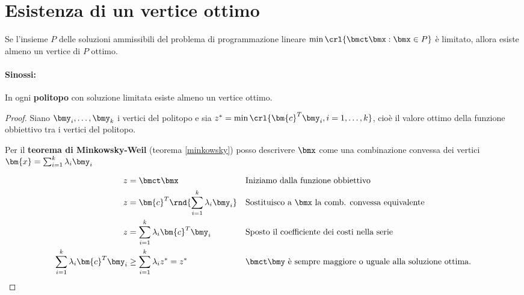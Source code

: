 \documentclass[\main/main.tex]{subfiles}
\begin{document}
\section{Esistenza di un vertice ottimo}

\begin{theorem}
  Se l'insieme $P$ delle soluzioni ammissibili del problema di programmazione lineare $\min\crl{\bmct\bmx:\bmx\in P}$ è limitato, allora esiste almeno un vertice di $P$ ottimo.
  \paragraph*{Sinossi:} In ogni \textbf{politopo} con soluzione limitata esiste almeno un vertice ottimo.
\end{theorem}

\begin{proof}
  Siano $\bmy_i, \ldots, \bmy_k$ i vertici del politopo e sia $z^* = \min \crl{\bm{c}^T\bmy_i, i=1,\ldots,k}$, cioè il valore ottimo della funzione obbiettivo tra i vertici del politopo.

  Per il \textbf{teorema di Minkowsky-Weil} (teorema \ref{minkowsky}) posso descrivere $\bmx$ come una combinazione convessa dei vertici $\bm{x} = \sum_{i=1}^k \lambda_i \bmy_i$

  \begin{align*}
    z                                     & = \bmct \bmx                                  &  & \text{Iniziamo dalla funzione obbiettivo}                             \\
    z                                     & = \bm{c}^T\rnd{\sum_{i=1}^k \lambda_i \bmy_i} &  & \text{Sostituisco a $\bmx$ la comb. convessa equivalente}             \\
    z                                     & = \sum_{i=1}^k \lambda_i \bm{c}^T\bmy_i       &  & \text{Sposto il coefficiente dei costi nella serie}                   \\
    \sum_{i=1}^k \lambda_i \bm{c}^T\bmy_i & \geq \sum_{i=1}^k  \lambda_i z^* = z^*        &  & \text{$\bmct \bmy$ è sempre maggiore o uguale alla soluzione ottima.} \\
  \end{align*}
\end{proof}
\end{document}
